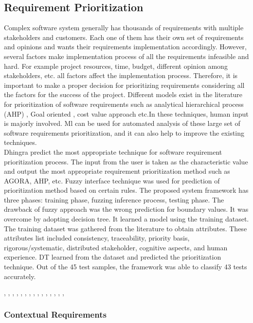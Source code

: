 \subsection{Requirement Prioritization}
Complex software system generally has thousands of requirements with multiple stakeholders and customers. Each one of them has their own set of requirements and opinions and wants their requirements implementation accordingly. However, several factors make implementation process of all the requirements infeasible and hard. For example project resources, time, budget, different opinion among stakeholders, etc. all factors affect the implementation process. Therefore, it is important to make a proper decision for prioritizing requirements considering all the factors for the success of the project. Different models exist in the literature for prioritization of software requirements such as analytical hierarchical process (AHP) \cite{saaty2008}, Goal oriented \cite{VanLamsweerde:2001}, cost value approach \cite{Karlsson:1997} etc.In these techniques, human input is majorly involved.  Ml can be used for automated analysis of these large set of software requirements prioritization, and it can also help to improve the existing techniques.\\

 Dhingra \etal  \cite{S. Dhingra } predict the most appropriate technique for software requirement prioritization process. The input from the user is taken as the characteristic value and output the most appropriate requirement prioritization method such as AGORA, AHP, etc. Fuzzy interface technique was used for prediction of prioritization method based on certain rules. The proposed system framework has three phases: training phase, fuzzing inference process, testing phase. The drawback of fuzzy approach was the wrong prediction for boundary values. It was overcome by adopting decision tree. It learned a model using the training dataset. The training dataset was gathered from the literature to obtain attributes. These attributes list included consistency,
traceability, priority basis, rigorous/systematic, distributed stakeholder,
cognitive aspects, and human experience.  DT learned from the dataset and predicted the prioritization technique. Out of the 45 test samples,
the framework was able to classify 43 tests accurately.



\cite{Deocadez:2017}, \cite{Kurtanovic:2017}, \cite{Guzman:2017},
\cite{Abad:2017}, \cite{Dekhtyar:2017}, \cite{Rashwan:2012}, \cite{Lu:2017},
\cite{Hayes:2014}, \cite{Williams:2017}, \cite{Garzoli:2013},
\cite{Casamayor:2010}, \cite{Wang:2016}, \cite{Hussain:2012}, \cite{Jiang:2014},
\cite{Jha:2017}, \cite{Pinquie:2015}



\subsubsection{Contextual Requirements} 

